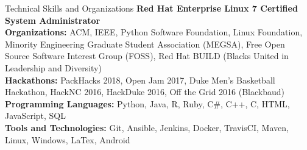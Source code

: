\documentclass{resume} %
\begin{document}
\begin{rSection}{Technical Skills and Organizations}
\textbf{Red Hat Enterprise Linux 7 Certified System Administrator} \\
\textbf{Organizations:} ACM, IEEE, Python Software Foundation, Linux Foundation, Minority Engineering Graduate Student Association (MEGSA), Free Open Source Software Interest Group (FOSS), Red Hat BUILD (Blacks United in Leadership and Diversity) \\
\textbf{Hackathons:} PackHacks 2018, Open Jam 2017, Duke Men's Basketball Hackathon, HackNC 2016, HackDuke 2016, Off the Grid 2016 (Blackbaud) \\
\textbf{Programming Languages:} Python, Java, R, Ruby, C\#, C++, C, HTML, JavaScript, SQL \\
\textbf{Tools and Technologies:} Git, Ansible, Jenkins, Docker, TravisCI, Maven, Linux, Windows, LaTex, Android
\end{rSection}
\vspace{-8pt}
\end{document}
